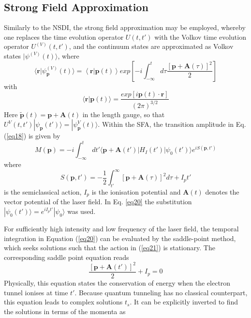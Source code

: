 \documentclass[11pt]{article}
\numberwithin{equation}{section}
\begin{document}
\subsection{Strong Field Approximation}
Similarly to the NSDI, the strong field approximation may be employed, whereby one replaces the time evolution operator $U(t,t')$ with the Volkov time evolution operator $U^{(V)}(t,t')$, and the continuum states are approximated as Volkov states $|\psi^{(V)}(t)\rangle$, where
\begin{equation} \label{eq19}
    \langle\textbf{r}|\psi_{\textbf{p}}^{(V)}(t)\rangle =\left < \mathbf{r}| \mathbf{p}(t) \right> exp \left[ -i \int_{-\infty}^t d\tau \frac{[\mathbf{p} + \mathbf{A}(\tau)]^2}{2} \right]
\end{equation} 
with 
\begin{equation}
    \langle \mathbf{r} | \mathbf{p}(t) \rangle = \frac{exp[i \mathbf{p}(t) \cdot \mathbf{r}]}{(2\pi)^{3/2}}
\end{equation}
Here $\tilde{\textbf{p}}(t) = \textbf{p} + \textbf{A}(t)$ in the length gauge, so that $U^V(t,t') |\psi_{\mathbf{p}}(t')\rangle = |\psi_{\mathbf{p}}^V(t)\rangle$. Within the SFA, the transition amplitude in Eq. (\ref{eq18}) is given by 
\begin{equation} \label{eq20}
    M(\textbf{p}) = -i \int_{-\infty}^t dt'\langle\textbf{p} + \textbf{A}(t')|H_I(t')|\psi_0(t')\rangle e^{iS(\textbf{p},t')}
\end{equation}
where
\begin{equation} \label{eq21}
    S(\textbf{p},t') = -\frac{1}{2}\int_{t'}^\infty[\textbf{p} + \textbf{A}(\tau)]^2d\tau + I_pt'
\end{equation}
is the semiclassical action, $I_p$ is the ionisation potential and $\mathbf{A}(t)$ denotes the vector potential of the laser field. In Eq. \ref{eq20} the substitution $| \psi_0(t')\rangle = e^{i I_p t'} | \psi_0\rangle$ was used.
\par
For sufficiently high intensity and low frequency of the laser field, the temporal integration in Equation (\ref{eq20}) can be evaluated by the saddle-point method, which seeks solutions such that the action in (\ref{eq21}) is stationary. The corresponding saddle point equation reads 
\begin{equation}
    \frac{[\textbf{p} + \textbf{A}(t')]^2}{2} + I_p = 0
\end{equation}
Physically, this equation states the conservation of energy when the electron tunnel ionises at time $t'$. Because quantum tunneling has no classical counterpart, this equation leads to complex solutions $t_s$. It can be explicitly inverted to find the solutions in terms of the momenta as
\end{document}
